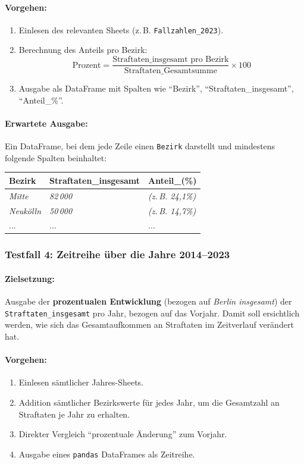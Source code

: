 \documentclass[11pt,a4paper]{article}
\begin{document}
\paragraph{Vorgehen:}
\begin{enumerate}
    \item Einlesen des relevanten Sheets (z.\,B. \texttt{Fallzahlen\_2023}).
    \item Berechnung des Anteils pro Bezirk: 
    \[
       \text{Prozent} = \frac{\text{Straftaten\_insgesamt pro Bezirk}}{\text{Straftaten\_Gesamtsumme}} \times 100 
    \]
    \item Ausgabe als DataFrame mit Spalten wie \enquote{Bezirk}, \enquote{Straftaten\_insgesamt}, \enquote{Anteil\_\%}.
\end{enumerate}

\paragraph{Erwartete Ausgabe:}
Ein DataFrame, bei dem jede Zeile einen \texttt{Bezirk} darstellt und mindestens folgende Spalten beinhaltet:
\begin{center}
    \begin{tabular}{|l|l|l|}
        \hline
        \textbf{Bezirk} & \textbf{Straftaten\_insgesamt} & \textbf{Anteil\_(\%)} \\
        \hline
        \textit{Mitte} & \textit{82\,000} & \textit{(z.\,B. 24,1\%)} \\
        \textit{Neukölln} & \textit{50\,000} & \textit{(z.\,B. 14,7\%)} \\
        ... & ... & ...\\
        \hline
    \end{tabular}
\end{center}

\subsubsection{Testfall 4: Zeitreihe über die Jahre 2014--2023}
\paragraph{Zielsetzung:}
Ausgabe der \textbf{prozentualen Entwicklung} (bezogen auf \emph{Berlin insgesamt}) der \texttt{Straftaten\_insgesamt} pro Jahr, bezogen auf das Vorjahr. Damit soll ersichtlich werden, wie sich das Gesamtaufkommen an Straftaten im Zeitverlauf verändert hat. 

\paragraph{Vorgehen:}
\begin{enumerate}
    \item Einlesen sämtlicher Jahres-Sheets.
    \item Addition sämtlicher Bezirkswerte für jedes Jahr, um die Gesamtzahl an Straftaten je Jahr zu erhalten.
    \item Direkter Vergleich \enquote{prozentuale Änderung} zum Vorjahr.
    \item Ausgabe eines \texttt{pandas} DataFrames als Zeitreihe.
\end{enumerate}
\end{document}
